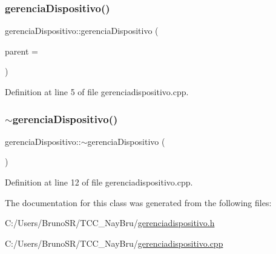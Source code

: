 \subsubsection{\texorpdfstring{gerencia\+Dispositivo()}{gerenciaDispositivo()}}
{\footnotesize\ttfamily gerencia\+Dispositivo\+::gerencia\+Dispositivo (\begin{DoxyParamCaption}\item[{Q\+Widget $\ast$}]{parent = {} }\end{DoxyParamCaption})\hspace{0.3cm}{\ttfamily [explicit]}}



Definition at line 5 of file gerenciadispositivo.\+cpp.

\hypertarget{classgerencia_dispositivo_a3dcef9c3f95ad6be653920a0952b8a0a}{}\label{classgerencia_dispositivo_a3dcef9c3f95ad6be653920a0952b8a0a} 
\subsubsection{\texorpdfstring{$\sim$gerencia\+Dispositivo()}{~gerenciaDispositivo()}}
{\footnotesize\ttfamily gerencia\+Dispositivo\+::$\sim$gerencia\+Dispositivo (\begin{DoxyParamCaption}{ }\end{DoxyParamCaption})}



Definition at line 12 of file gerenciadispositivo.\+cpp.



The documentation for this class was generated from the following files\+:\begin{DoxyCompactItemize}
\item 
C\+:/\+Users/\+Bruno\+S\+R/\+T\+C\+C\+\_\+\+Nay\+Bru/\hyperlink{gerenciadispositivo_8h}{gerenciadispositivo.\+h}\item 
C\+:/\+Users/\+Bruno\+S\+R/\+T\+C\+C\+\_\+\+Nay\+Bru/\hyperlink{gerenciadispositivo_8cpp}{gerenciadispositivo.\+cpp}\end{DoxyCompactItemize}
